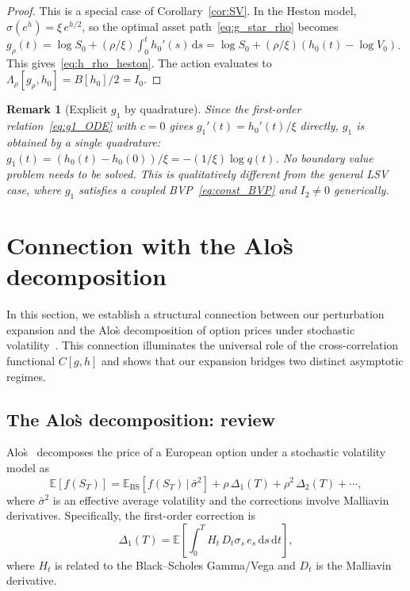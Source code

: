 \documentclass[11pt]{article}
\newtheorem{remark}[theorem]{Remark}
\theoremstyle{definition}
\newcommand{\dd}{\mathrm{d}}
\newcommand{\E}{\mathbb{E}}
\begin{document}
\begin{proof}
This is a special case of Corollary~\ref{cor:SV}. In the Heston model, $\sigma(e^h) = \xi\,e^{h/2}$, so the optimal asset path~\eqref{eq:g_star_rho} becomes $g_\rho(t) = \log S_0 + (\rho/\xi)\int_0^t h_0'(s)\,\dd s = \log S_0 + (\rho/\xi)(h_0(t) - \log V_0)$. This gives~\eqref{eq:h_rho_heston}. The action evaluates to $\Lambda_\rho[g_\rho, h_0] = B[h_0]/2 = I_0$.
\end{proof}

\begin{remark}[Explicit $g_1$ by quadrature]\label{rem:g1_solvability}
Since the first-order relation~\eqref{eq:g1_ODE} with $c = 0$ gives $g_1'(t) = h_0'(t)/\xi$ directly, $g_1$ is obtained by a single quadrature: $g_1(t) = (h_0(t) - h_0(0))/\xi = -(1/\xi)\log q(t)$. No boundary value problem needs to be solved. This is qualitatively different from the general LSV case, where $g_1$ satisfies a coupled BVP~\eqref{eq:const_BVP} and $I_2 \neq 0$ generically.
\end{remark}

\section{Connection with the Alo\`s decomposition}\label{sec:alos}

In this section, we establish a structural connection between our perturbation expansion and the Alo\`s decomposition of option prices under stochastic volatility~\cite{Alos2006,Alos2012}. This connection illuminates the universal role of the cross-correlation functional $C[g,h]$ and shows that our expansion bridges two distinct asymptotic regimes.

\subsection{The Alo\`s decomposition: review}\label{sec:alos_review}

Alo\`s~\cite{Alos2006,Alos2012} decomposes the price of a European option under a stochastic volatility model as
\begin{equation}\label{eq:alos_decomp}
  \E[f(S_T)] = \E_{\mathrm{BS}}[f(S_T)\,|\,\bar{\sigma}^2] + \rho\,\Delta_1(T) + \rho^2\,\Delta_2(T) + \cdots,
\end{equation}
where $\bar{\sigma}^2$ is an effective average volatility and the corrections involve Malliavin derivatives. Specifically, the first-order correction is
\begin{equation}
  \Delta_1(T) = \E\!\left[\int_0^T H_t\,D_t\sigma_s\,e_s\,\dd s\,\dd t\right],
\end{equation}
where $H_t$ is related to the Black--Scholes Gamma/Vega and $D_t$ is the Malliavin derivative.
\end{document}
